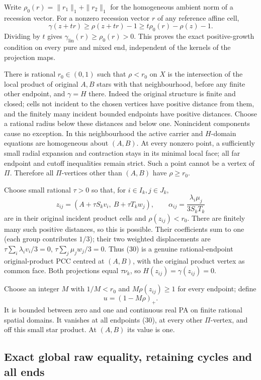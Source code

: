 \documentclass[
  11pt,
]{article}
\begin{document}
Write \(\rho_0(r)=\|r_1\|_1+\|r_2\|_1\) for the homogeneous
ambient norm of a recession vector. For a nonzero recession vector
\(r\) of any reference affine cell, \[
 \gamma(z+tr)\geq\rho(z+tr)-1\geq t\rho_0(r)-\rho(z)-1.
\] Dividing by \(t\) gives \(\gamma_{\mathrm{lin}}(r)\geq\rho_0(r)>0\).
This proves the exact positive-growth condition on every pure and mixed
end, independent of the kernels of the projection maps.

There is rational \(r_0\in(0,1)\) such that \(\rho<r_0\) on \(X\) is
the intersection of the local product of original \(A,B\) stars with that neighbourhood, before any finite
other endpoint, and \(\gamma=H\) there. Indeed the original structure is
finite and closed; cells not incident to the chosen vertices have
positive distance from them, and the finitely many incident bounded
endpoints have positive distances. Choose a rational radius below these
distances and below one. Nonincident components cause no exception. In
this neighbourhood the active carrier and \(H\)-domain equations are
homogeneous about \((A,B)\). At every nonzero point, a sufficiently
small radial expansion and contraction stays in its minimal local face;
all far endpoint and cutoff inequalities remain strict. Such a point
cannot be a vertex of \(\Pi\). Therefore all \(\Pi\)-vertices other than
\((A,B)\) have \(\rho\geq r_0\).

Choose small rational \(\tau>0\) so that, for \(i\in I_k,j\in J_k\), \[
 z_{ij}=(A+\tau S_kv_i,\ B+\tau T_kw_j),\qquad
 \alpha_{ij}=\frac{\lambda_i\mu_j}{3S_kT_k}                 \tag{30}
\] are in their original incident product cells and
\(\rho(z_{ij})<r_0\). There are finitely many such positive distances,
so this is possible. Their coefficients sum to one (each group
contributes \(1/3\)); their two weighted displacements are
\(\tau\sum_i\lambda_iv_i/3=0\), \(\tau\sum_j\mu_jw_j/3=0\). Thus (30) is
a genuine rational-endpoint original-product PCC centred at \((A,B)\),
with the original product vertex as common face. Both projections equal
\(\tau\nu_k\), so \(H(z_{ij})=\gamma(z_{ij})=0\).

Choose an integer \(M\) with \(1/M<r_0\) and \(M\rho(z_{ij})\geq1\) for
every endpoint; define \[
                          u=(1-M\rho)_+.                  \tag{31}
\] It is bounded between zero and one and continuous real PA on finite
rational spatial domains. It vanishes at all endpoints (30), at every
other \(\Pi\)-vertex, and off this small star product. At \((A,B)\) its
value is one.

\subsection{Exact global raw equality, retaining cycles and all
ends}\label{exact-global-raw-equality-retaining-cycles-and-all-ends}
\end{document}
